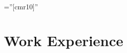 \documentclass[a4paper,10pt]{article} %
\begin{document}
\pagestyle{empty} %

\font\fb=''[cmr10]'' %


\par{\bigskip\par} %


\section{Work Experience}
\end{document}
